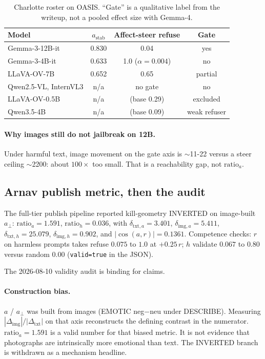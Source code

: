 \documentclass{article}
\begin{document}
\begin{table}[t]
\caption{Charlotte roster on OASIS. ``Gate'' is a qualitative label from the writeup, not a pooled effect size with Gemma-4.}
\label{tab:models}
\centering
\footnotesize
\begin{tabular}{@{}lccc@{}}
\toprule
Model & $a_{\mathrm{stab}}$ & Affect-steer refuse & Gate \\
\midrule
Gemma-3-12B-it & 0.830 & 0.04 & yes \\
Gemma-3-4B-it & 0.633 & 1.0 ($\alpha=0.004$) & no \\
LLaVA-OV-7B & 0.652 & 0.65 & partial \\
Qwen2.5-VL, InternVL3 & n/a & no gate & no \\
LLaVA-OV-0.5B & n/a & (base 0.29) & excluded \\
Qwen3.5-4B & n/a & (base 0.09) & weak refuser \\
\bottomrule
\end{tabular}
\end{table}

\paragraph{Why images still do not jailbreak on 12B.}
Under harmful text, image movement on the gate axis is $\sim$11-22 versus a steer ceiling $\sim$2200: about $100\times$ too small. That is a reachability gap, not $\mathrm{ratio}_a$.

\subsection{Arnav publish metric, then the audit}
\label{sec:inverted}

The full-tier publish pipeline reported kill-geometry INVERTED on image-built $a_\perp$: $\mathrm{ratio}_a=1.591$, $\mathrm{ratio}_h=0.036$, with $\delta_{\mathrm{txt},a}=3.401$, $\delta_{\mathrm{img},a}=5.411$, $\delta_{\mathrm{txt},h}=25.079$, $\delta_{\mathrm{img},h}=0.902$, and $|\cos(a,r)|=0.1361$. Competence checks: $r$ on harmless prompts takes refuse $0.075$ to $1.0$ at $+0.25\,r$; $h$ validate $0.067$ to $0.80$ versus random 0.00 (\texttt{valid=true} in the JSON).

The 2026-08-10 validity audit is binding for claims.

\paragraph{Construction bias.}
$a$ / $a_\perp$ was built from images (EMOTIC neg$-$neu under DESCRIBE). Measuring $|\Delta_{\mathrm{img}}|/|\Delta_{\mathrm{txt}}|$ on that axis reconstructs the defining contrast in the numerator. $\mathrm{ratio}_a=1.591$ is a valid number for that biased metric. It is not evidence that photographs are intrinsically more emotional than text. The INVERTED branch is withdrawn as a mechanism headline.
\end{document}

